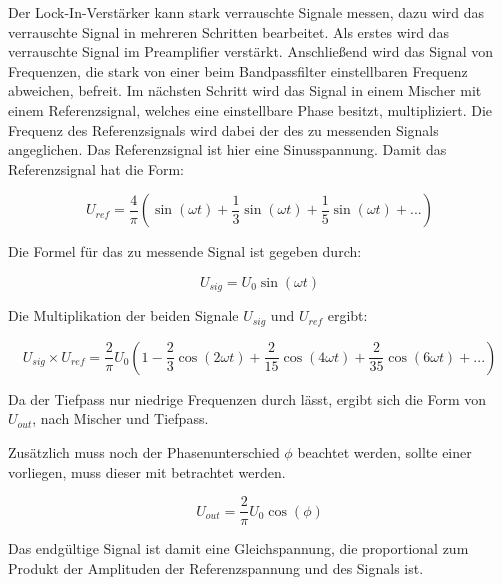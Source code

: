 Der Lock-In-Verstärker kann stark verrauschte Signale messen, dazu wird das verrauschte Signal in mehreren Schritten bearbeitet. Als erstes wird das verrauschte Signal im Preamplifier verstärkt. Anschließend wird das Signal von Frequenzen, die stark von einer beim Bandpassfilter einstellbaren Frequenz abweichen, befreit.
Im nächsten Schritt wird das Signal in einem Mischer mit einem
Referenzsignal, welches eine einstellbare Phase besitzt, multipliziert. Die Frequenz des Referenzsignals wird dabei der des zu messenden Signals angeglichen. Das Referenzsignal ist hier eine Sinusspannung. 
Damit das Referenzsignal hat die Form:

\begin{equation}
  \label{eq:ref}
  U_{ref} = \frac{4}{\pi} \left( \sin(\omega t) + \frac{1}{3} \sin(\omega t) + \frac{1}{5} \sin(\omega t) + ... \right)
\end{equation}

Die Formel für das zu messende Signal ist gegeben durch:

\begin{equation}
  \label{eq:sig}
  U_{sig} = U_{0} \sin(\omega t)
\end{equation}

Die Multiplikation der beiden Signale $U_{sig}$ und $U_{ref}$ ergibt:

\begin{equation*}
  U_{sig} \times U_{ref} = \frac{2}{\pi} U_{0} \left(1 - \frac{2}{3} \cos(2\omega t) + \frac{2}{15} \cos(4\omega t) + \frac{2}{35} \cos(6\omega t) + ... \right)
\end{equation*}

Da der Tiefpass nur niedrige Frequenzen durch lässt, ergibt sich die Form von $U_{out}$, nach Mischer und Tiefpass.

Zusätzlich muss noch der Phasenunterschied $\phi$ beachtet werden, sollte einer vorliegen, muss dieser mit betrachtet werden.

\begin{equation}
  \label{eq:out}
   U_{out} = \frac{2}{\pi} U_{0} \cos(\phi)
\end{equation}

Das endgültige Signal ist damit eine Gleichspannung, die proportional zum
Produkt der Amplituden der Referenzspannung und des Signals ist.
